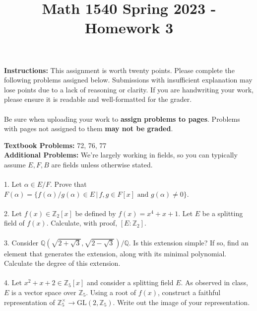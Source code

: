 \documentclass[12pt]{article}
\title{Math 1540 Spring 2023 - Homework 3}
\date{}
\newcommand{\Z}{\mathbb{Z}}
\newcommand{\Q}{\mathbb{Q}}
\newcommand{\GL}{\text{GL}}
\newcommand{\lra}{\longrightarrow}
\begin{document}
\maketitle
\vspace{-0.5in}
\begin{spacing}{1.5}
\noindent \textbf{Instructions:}  This assignment is worth twenty points.  Please complete the following problems assigned below.  Submissions with insufficient explanation may lose points due to a lack of reasoning or clarity.  If you are handwriting your work, please ensure it is readable and well-formatted for the grader.\\
\\
Be sure when uploading your work to \textbf{assign problems to pages}.  Problems with pages not assigned to them \textbf{may not be graded}.  
\end{spacing}




\vspace{10mm}\noindent
\textbf{Textbook Problems: }72, 76, 77
\\

\noindent
\textbf{Additional Problems:}  We're largely working in fields, so you can typically assume $E,F,B$ are fields unless otherwise stated.\\
\\
1.  Let $\alpha \in E/F$.  Prove that $F(\alpha) = \{f(\alpha)/g(\alpha) \in E \, | \, f,g \in F[x]\text{ and } g(\alpha) \neq 0\}$.  \\
\\
2.  Let $f(x) \in \Z_{2}[x]$ be defined by $f(x) = x^4+x+1$.  Let $E$ be a splitting field of $f(x)$.  Calculate, with proof, $[E:\Z_{2}]$. \\
\\
3.  Consider $\Q(\sqrt{2+\sqrt{3}},\sqrt{2-\sqrt{3}})/\Q$.  Is this extension simple?  If so, find an element that generates the extension, along with its minimal polynomial.  Calculate the degree of this extension.   \\
\\
4.  Let $x^{2} + x + 2 \in \Z_{5}[x]$ and consider a splitting field $E$.  As observed in class, $E$ is a vector space over $\Z_{5}$.  Using a root of $f(x)$, construct a faithful representation of $\Z_{5}^{\times} \lra \GL(2,\Z_{5})$.  Write out the image of your representation.   
\end{document}
